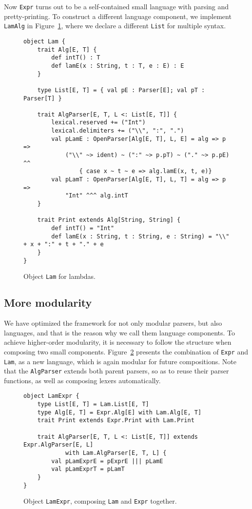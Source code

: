 Now \lstinline{Expr} turns out to be a self-contained small language with parsing and pretty-printing. To construct a different language component, we implement \lstinline{LamAlg} in Figure~\ref{fig:objectlam}, where we declare a different \lstinline{List} for multiple syntax.

\begin{figure}[htbp]
\centering
\begin{lstlisting}
object Lam {
    trait Alg[E, T] {
        def intT() : T
        def lamE(x : String, t : T, e : E) : E
    }

    type List[E, T] = { val pE : Parser[E]; val pT : Parser[T] }

    trait AlgParser[E, T, L <: List[E, T]] {
        lexical.reserved += ("Int")
        lexical.delimiters += ("\\", ":", ".")
        val pLamE : OpenParser[Alg[E, T], L, E] = alg => p =>
            ("\\" ~> ident) ~ (":" ~> p.pT) ~ ("." ~> p.pE) ^^
                { case x ~ t ~ e => alg.lamE(x, t, e)}
        val pLamT : OpenParser[Alg[E, T], L, T] = alg => p =>
            "Int" ^^^ alg.intT
    }

    trait Print extends Alg[String, String] {
        def intT() = "Int"
        def lamE(x : String, t : String, e : String) = "\\" + x + ":" + t + "." + e
    }
}
\end{lstlisting}
\caption{Object \lstinline{Lam} for lambdas.}\label{fig:objectlam}
\end{figure}

\subsection{More modularity}

We have optimized the framework for not only modular parsers, but also languages, and that is the reason why we call them language components. To achieve
higher-order modularity, it is necessary to follow the structure when composing two small components. Figure~\ref{fig:objectlamexpr} presents the combination of \lstinline{Expr} and \lstinline{Lam}, as a new language, which is again modular for future compositions. Note that the \lstinline{AlgParser} extends both parent parsers, so as to reuse their parser functions, as well as composing lexers automatically.

\begin{figure}[htbp]
\centering
\begin{lstlisting}
object LamExpr {
    type List[E, T] = Lam.List[E, T]
    type Alg[E, T] = Expr.Alg[E] with Lam.Alg[E, T]
    trait Print extends Expr.Print with Lam.Print

    trait AlgParser[E, T, L <: List[E, T]] extends Expr.AlgParser[E, L]
            with Lam.AlgParser[E, T, L] {
        val pLamExprE = pExprE ||| pLamE
        val pLamExprT = pLamT
    }
}
\end{lstlisting}
\caption{Object \lstinline{LamExpr}, composing \lstinline{Lam} and \lstinline{Expr} together.}\label{fig:objectlamexpr}
\end{figure}

